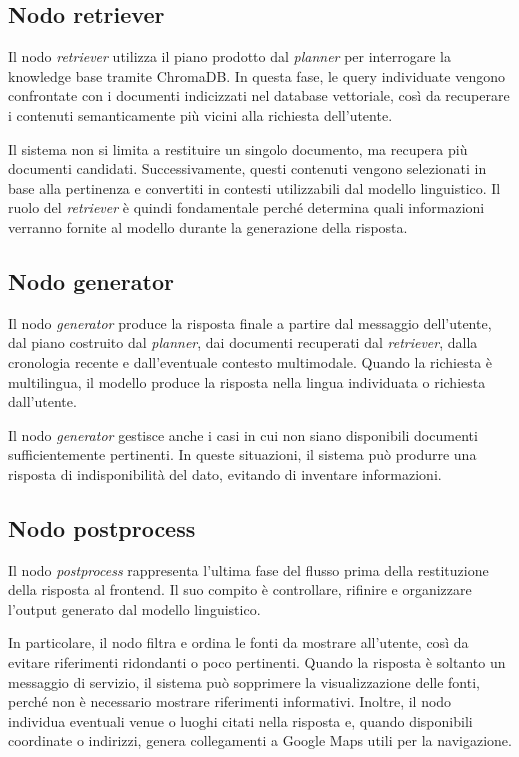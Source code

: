 \subsection*{Nodo retriever}

Il nodo \textit{retriever} utilizza il piano prodotto dal \textit{planner} per interrogare la knowledge base tramite ChromaDB. In questa fase, le query individuate vengono confrontate con i documenti indicizzati nel database vettoriale, così da recuperare i contenuti semanticamente più vicini alla richiesta dell’utente.

Il sistema non si limita a restituire un singolo documento, ma recupera più documenti candidati. Successivamente, questi contenuti vengono selezionati in base alla pertinenza e convertiti in contesti utilizzabili dal modello linguistico. Il ruolo del \textit{retriever} è quindi fondamentale perché determina quali informazioni verranno fornite al modello durante la generazione della risposta.

\subsection*{Nodo generator}

Il nodo \textit{generator} produce la risposta finale a partire dal messaggio dell’utente, dal piano costruito dal \textit{planner}, dai documenti recuperati dal \textit{retriever}, dalla cronologia recente e dall’eventuale contesto multimodale. Quando la richiesta è multilingua, il modello produce la risposta nella lingua individuata o richiesta dall’utente.

Il nodo \textit{generator} gestisce anche i casi in cui non siano disponibili documenti sufficientemente pertinenti. In queste situazioni, il sistema può produrre una risposta di indisponibilità del dato, evitando di inventare informazioni.

\subsection*{Nodo postprocess}

Il nodo \textit{postprocess} rappresenta l’ultima fase del flusso prima della restituzione della risposta al frontend. Il suo compito è controllare, rifinire e organizzare l’output generato dal modello linguistico.

In particolare, il nodo filtra e ordina le fonti da mostrare all’utente, così da evitare riferimenti ridondanti o poco pertinenti. Quando la risposta è soltanto un messaggio di servizio, il sistema può sopprimere la visualizzazione delle fonti, perché non è necessario mostrare riferimenti informativi. Inoltre, il nodo individua eventuali venue o luoghi citati nella risposta e, quando disponibili coordinate o indirizzi, genera collegamenti a Google Maps utili per la navigazione.

